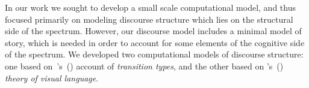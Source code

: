



In our work we sought to develop a small scale computational model, and thus focused primarily on modeling discourse structure which lies on the structural side of the spectrum. However, our discourse model includes a minimal model of story, which is needed in order to account for some elements of the cognitive side of the spectrum.  We developed two computational models of discourse structure: one based on~\citeauthor{mcCloud1993understanding}'s~(\citeyear{mcCloud1993understanding}) account of \emph{transition types}, and the other based on \citeauthor{cohn2013visual}'s~(\citeyear{cohn2013visual}) \emph{theory of visual language}.



